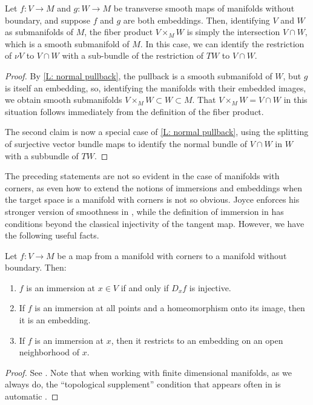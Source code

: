\begin{lemma}\label{L: fiber product of embeddings}
	Let $f \colon V \to M$ and $g \colon W \to M$ be transverse smooth maps of manifolds without boundary, and suppose $f$ and $g$ are both embeddings.
	Then, identifying $V$ and $W$ as submanifolds of $M$, the fiber product $V \times_MW$ is simply the intersection $V \cap W$, which is a smooth submanifold of $M$.
	In this case, we can identify the restriction of $\nu V$ to $V \cap W$ with a sub-bundle of the restriction of $TW$ to $V \cap W$.
\end{lemma}

\begin{proof}
	By \cref{L: normal pullback}, the pullback is a smooth submanifold of $W$, but $g$ is itself an embedding, so, identifying the manifolds with their embedded images, we obtain smooth submanifolds $V \times_MW \subset W \subset M$.
	That $V \times_MW = V \cap W$ in this situation follows immediately from the definition of the fiber product.

	The second claim is now a special case of \cref{L: normal pullback}, using the splitting of surjective vector bundle maps \cite[Theorem 3.9.6]{Hus75} to identify the normal bundle of $V \cap W$ in $W$ with a subbundle of $TW$. 
\end{proof}

The preceding statements are not so evident in the case of manifolds with corners, as even how to extend the notions of immersions and embeddings when the target space is a manifold with corners is not so obvious. Joyce enforces his stronger version of smoothness in \cite{Joy12}, while the definition of immersion in \cite[Section 3.2]{MaDo92} has conditions beyond the classical injectivity of the tangent map. However, we have the following useful facts.

\begin{lemma}\label{L: immersions}
	Let $f \colon V \to M$ be a map from a manifold with corners to a manifold without boundary.
	Then:
	\begin{enumerate}
		\item $f$ is an immersion at $x \in V$ if and only if $D_xf$ is injective.
		\item If $f$ is an immersion at all points and a homeomorphism onto its image, then it is an embedding.
		\item If $f$ is an immersion at $x$, then it restricts to an embedding on an open neighborhood of $x$.
	\end{enumerate}
\end{lemma}
\begin{proof}
	See \cite[Theorem 3.2.6, Proposition 3.2.13, and Definition 3.3.1]{MaDo92}. 
	Note that when working with finite dimensional manifolds, as we always do, the ``topological supplement'' condition that appears often in \cite{MaDo92} is automatic \cite[page 7]{MaDo92}.
\end{proof}

